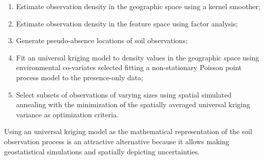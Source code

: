 \begin{enumerate}
 \item Estimate observation density in the geographic space using a kernel smoother;
 
 \item Estimate observation density in the feature space using factor analysis;
 
 \item Generate pseudo-absence locations of soil observations;
 
 \item Fit an universal kriging model to density values in the geographic space using environmental co-variates
 selected fitting a non-stationary Poisson point process model to the presence-only data;

 \item Select subsets of observations of varying sizes using spatial simulated annealing with the minimization 
 of the spatially averaged universal kriging variance as optimization criteria.
\end{enumerate}

Using an universal kriging model as the mathematical representation of the soil observation process is an 
attractive alternative because it allows making geostatistical simulations and spatially depicting 
uncertainties.
